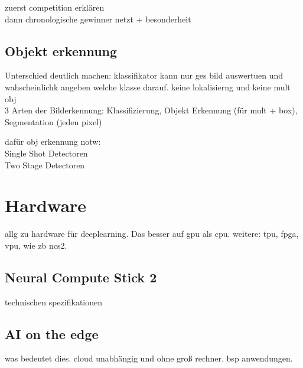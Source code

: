 zuerst competition erklären \\
dann chronologische gewinner netzt + besonderheit\\




\subsection{Objekt erkennung}\label{sec:objdet}


Unterschied deutlich machen: klassifikator kann nur ges bild auswertuen und wahscheinlichk angeben welche 
klasse darauf. keine lokalisierng und keine mult obj\\

3 Arten der Bilderkennung: Klassifizierung, Objekt Erkennung (für mult + box), Segmentation (jeden pixel)

dafür obj erkennung notw:\\

Single Shot Detectoren
\\

Two Stage Detectoren


\section{Hardware}\label{sec:hardware}


allg zu hardware für deeplearning. Das besser auf gpu als cpu. weitere: tpu, fpga, vpu, wie zb ncs2.

\subsection{Neural Compute Stick 2}

technischen spezifikationen





\subsection{AI on the edge}

was bedeutet dies. cloud unabhängig und ohne groß rechner. bsp anwendungen.

